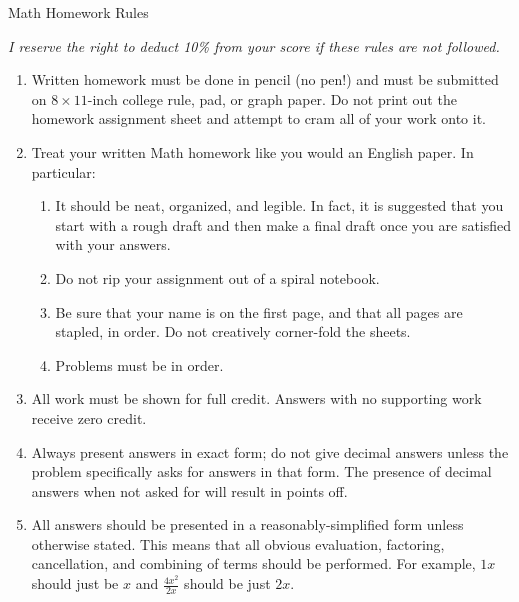 \documentclass[letterpaper,12pt,fleqn]{article}
\begin{document}
\begin{center}
  {\Large Math Homework Rules}

  \vspace{0.25in}

  \emph{I reserve the right to deduct 10\% from your score if these rules are not followed.}
\end{center}

\vspace{0.25in}

\begin{enumerate}
\item Written homework must be done in pencil (no pen!) and must be submitted on \(8\times11\)-inch college rule, pad, or
  graph paper.  Do not print out the homework assignment sheet and attempt to cram all of your work onto it.

\item Treat your written Math homework like you would an English paper. In
  particular:
  \begin{enumerate}
  \item It should be neat, organized, and legible. In fact, it is suggested that you start with a rough draft and then make a
    final draft once you are satisfied with your answers.

  \item Do not rip your assignment out of a spiral notebook.
    
  \item Be sure that your name is on the first page, and that all pages are stapled, in order. Do not creatively corner-fold
    the sheets.
    
  \item Problems must be in order.
  \end{enumerate}
  
\item All work must be shown for full credit. Answers with no supporting work receive zero credit.

\item Always present answers in exact form; do not give decimal answers unless the problem specifically asks for answers in
  that form. The presence of decimal answers when not asked for will result in points off.

\item All answers should be presented in a reasonably-simplified form unless otherwise stated.  This means that all
  obvious evaluation, factoring, cancellation, and combining of terms should be performed.  For example, \(1x\) should just
  be \(x\) and \(\frac{4x^2}{2x}\) should be just \(2x\).


\end{enumerate}
\end{document}
